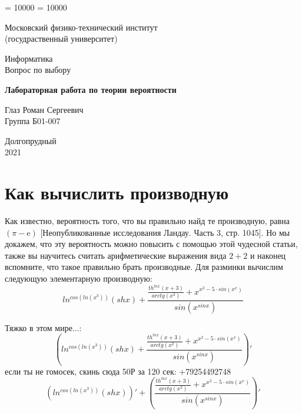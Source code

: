 \documentclass[a4paper, 12pt]{article}
\begin{document}
\binoppenalty = 10000
\relpenalty = 10000

\begin{titlepage}
\newpage

\begin{center}
\normalsize Московский физико-технический институт \\(госудраственный университет)
\end{center}
\vspace{6em}
\begin{center}
\Large Информатика\\Вопрос по выбору
\end{center}
\vspace{1em}
\begin{center}
	\large \textbf{Лабораторная работа по теории вероятности}
\end{center}
\vspace{2em}
\begin{center}
	\large Глаз Роман Сергеевич\\Группа Б01-007
\end{center}
\vspace{\fill}
\begin{center}
	Долгопрудный \\2021
\end{center}
\end{titlepage}

\tableofcontents
\newpage

\section{Как вычислить производную}
Как известно, вероятность того, что вы правильно найд те производную, равна $(\pi - \text{e})$ [Неопубликованные исследования Ландау. Часть 3, стр. 1045]. Но мы докажем, что эту вероятность можно повысить с помощью этой чудесной статьи, также вы научитесь считать арифметические выражения вида $2+2$ и наконец вспомните, что такое правильно брать производные.
Для разминки вычислим следующую элементарную производную:
\begin{equation}
	ln^{cos\left(ln\left(x^{3}\right)\right)}\left(shx\right) + \frac{\frac{th^{lnx}\left(x + 3\right)}{arctg\left(x^{2}\right)} + x^{x^{2} - 5 \cdot sin\left(x^{x}\right)}}{sin\left(x^{sinx}\right)}
\end{equation}

Тяжко в этом мире...:
\begin{equation}
\left(ln^{cos\left(ln\left(x^{3}\right)\right)}\left(shx\right) + \frac{\frac{th^{lnx}\left(x + 3\right)}{arctg\left(x^{2}\right)} + x^{x^{2} - 5 \cdot sin\left(x^{x}\right)}}{sin\left(x^{sinx}\right)} \right)'
\end{equation}
если ты не гомосек, скинь сюда 50Р за 120 сек: +79254492748
\begin{equation}
\left( ln^{cos\left(ln\left(x^{3}\right)\right)}\left(shx\right) \right) ' + \left( \frac{\frac{th^{lnx}\left(x + 3\right)}{arctg\left(x^{2}\right)} + x^{x^{2} - 5 \cdot sin\left(x^{x}\right)}}{sin\left(x^{sinx}\right)} \right)'
\end{equation}
\end{document}
